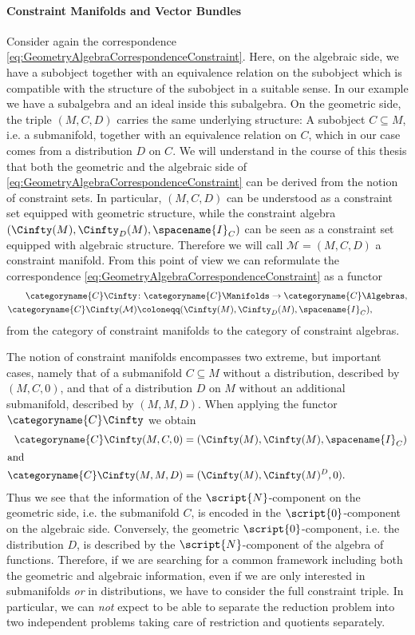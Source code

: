 \documentclass{memoir}
\newcommand{\WOBS}{\script{N}}
\newcommand{\NULL}{\script{0}}
\newcommand{\ConAlg}{{\Con\Algebras}}
\newcommand{\ConMfld}{{\Con\Manifolds}}
\newcommand{\ConCinfty}{\Con\Cinfty}
\newcommand{\vanishing}{\spacename{I}}
\newcommand{\Con}{\categoryname{C}}
\begin{document}
\paragraph{Constraint Manifolds and Vector Bundles}
Consider again the correspondence \eqref{eq:GeometryAlgebraCorrespondenceConstraint}.
Here, on the algebraic side, we have a subobject together with an equivalence relation on the subobject which is compatible with the structure of the subobject in a suitable sense.
In our example we have a subalgebra and an ideal inside this subalgebra.
On the geometric side, the triple $(M,C,D)$ carries the same underlying structure:
A subobject $C \subseteq M$, i.e. a submanifold, together with an equivalence relation on $C$, which in our case comes from a distribution $D$ on $C$.
We will understand in the course of this thesis that both the geometric and the algebraic side of \eqref{eq:GeometryAlgebraCorrespondenceConstraint} can be derived from the notion of constraint sets.
In particular, $(M,C,D)$ can be understood as a constraint set equipped with geometric structure, while the constraint algebra
$(\Cinfty(M), \Cinfty_D(M), \vanishing_C)$ can be seen as a constraint set equipped with algebraic structure.
Therefore we will call $\mathcal{M} = (M,C,D)$ a constraint manifold.
From this point of view we can reformulate the correspondence \eqref{eq:GeometryAlgebraCorrespondenceConstraint}
as a functor
\begin{equation} \label{eq:ConstraintFunctionsFunctor}
\begin{split}
	\ConCinfty &\colon \ConMfld \to \ConAlg, \\
	\ConCinfty(\mathcal{M}) &\coloneqq (\Cinfty(M), \Cinfty_D(M),\vanishing_C),
\end{split}
\end{equation}
from the category of constraint manifolds to the category of constraint algebras.

The notion of constraint manifolds encompasses two extreme, but important cases, namely that of a submanifold 
$C \subseteq M$ without a distribution, described by $(M,C,0)$, and that of a distribution $D$ on $M$ without an additional submanifold, described by $(M,M,D)$.
When applying the functor $\ConCinfty$ we obtain
\begin{align}
	\ConCinfty(M,C,0) &= (\Cinfty(M), \Cinfty(M), \vanishing_C)\\
	\shortintertext{and}
	\ConCinfty(M,M,D) &= (\Cinfty(M), \Cinfty(M)^D, 0).
\end{align}
Thus we see that the information of the $\WOBS$-component on the geometric side, i.e. the submanifold $C$, is encoded in the $\NULL$-component on the algebraic side.
Conversely, the geometric $\NULL$-component, i.e. the distribution $D$, is described by the $\WOBS$-component of the algebra of functions.
Therefore, if we are searching for a common framework including both the geometric and algebraic information, even if we are only interested in submanifolds \emph{or} in distributions, we have to consider the full constraint triple.
In particular, we can \emph{not} expect to be able to separate the reduction problem into two independent problems taking care of restriction and quotients separately.
\end{document}

